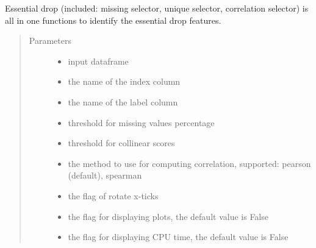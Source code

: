 \documentclass[letterpaper,11pt,english]{sphinxmanual}
\begin{document}
\begin{fulllineitems}
\begin{fulllineitems}
\label{\detokenize{auto_feature:AutoFeatures.AutoFeatures.essential_drop}}
Essential drop (included: missing selector, unique selector, correlation selector) is all in one functions
to identify the essential drop features.
\begin{quote}\begin{description}
\item[{Parameters}] \leavevmode\begin{itemize}
\item {} 
 \textendash{} input dataframe

\item {} 
 \textendash{} the name of the index column

\item {} 
 \textendash{} the name of the label column

\item {} 
 \textendash{} threshold for missing values percentage

\item {} 
 \textendash{} threshold for collinear scores

\item {} 
 \textendash{} the method to use for computing correlation, supported: pearson (default), spearman

\item {} 
 \textendash{} the flag of rotate x-ticks

\item {} 
 \textendash{} the flag for displaying plots, the default value is False

\item {} 
 \textendash{} the flag for displaying CPU time, the default value is False


\end{itemize}
\end{description}
\end{quote}
\end{fulllineitems}
\end{fulllineitems}
\end{document}
